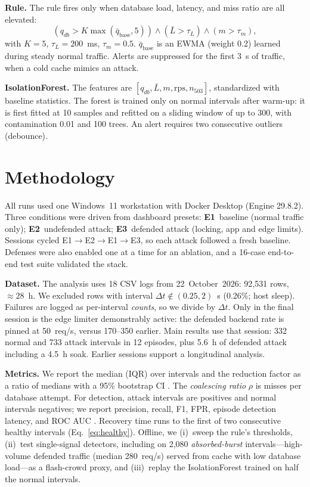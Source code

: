\documentclass[journal]{IEEEtran}
\begin{document}
\textbf{Rule.} The rule fires only when database load, latency, and miss ratio are all
elevated:
\begin{equation}
(q_{db} > K\max(\bar q_{\mathrm{base}},5)) \wedge (\bar L>\tau_L) \wedge (m>\tau_m),
\label{eq:rule}
\end{equation}
with $K=5$, $\tau_L=200$~ms, $\tau_m=0.5$. $\bar q_{\mathrm{base}}$ is an EWMA
(weight 0.2) learned during steady normal traffic. Alerts are suppressed for the first
3~s of traffic, when a cold cache mimics an attack.

\textbf{IsolationForest.} The features are
$[q_{db},\bar L, m, \text{rps}, n_{503}]$, standardized with baseline statistics. The
forest is trained only on normal intervals after warm-up: it is first fitted at 10
samples and refitted on a sliding window of up to 300, with contamination 0.01 and 100
trees. An alert requires two consecutive outliers (debounce).

\section{Methodology}
\label{sec:method}
All runs used one Windows~11 workstation with Docker Desktop (Engine 29.8.2). Three
conditions were driven from dashboard presets: \textbf{E1}~baseline (normal traffic
only); \textbf{E2}~undefended attack; \textbf{E3}~defended attack (locking, app and edge
limits). Sessions cycled E1$\rightarrow$E2$\rightarrow$E1$\rightarrow$E3, so each attack
followed a fresh baseline. Defenses were also enabled one at a time for an ablation, and
a 16-case end-to-end test suite validated the stack.

\textbf{Dataset.} The analysis uses 18 CSV logs from 22~October~2026: 92{,}531 rows,
${\approx}28$~h. We excluded rows with interval $\Delta t\notin(0.25,2)$~s (0.26\%;
host sleep). Failures are logged as per-interval \emph{counts}, so we divide by
$\Delta t$. Only in the final session is the edge limiter demonstrably active: the
defended backend rate is pinned at 50~req/s, versus 170--350 earlier. Main results use
that session: 332 normal and 733 attack intervals in 12 episodes, plus 5.6~h of
defended attack including a 4.5~h soak. Earlier sessions support a longitudinal
analysis.

\textbf{Metrics.} We report the median (IQR) over intervals and the reduction factor as
a ratio of medians with a 95\% bootstrap CI \cite{efron1994}. The \emph{coalescing
ratio} $\rho$ is misses per database attempt. For detection, attack intervals are
positives and normal intervals negatives; we report precision, recall, F1, FPR, episode
detection latency, and ROC AUC \cite{fawcett2006}. Recovery time runs to the first of
two consecutive healthy intervals (Eq.~\ref{eq:healthy}). Offline, we (i)~sweep the
rule's thresholds, (ii)~test single-signal detectors, including on 2{,}080
\emph{absorbed-burst} intervals---high-volume defended traffic (median 280~req/s)
served from cache with low database load---as a flash-crowd proxy, and (iii)~replay the
IsolationForest trained on half the normal intervals.
\end{document}
